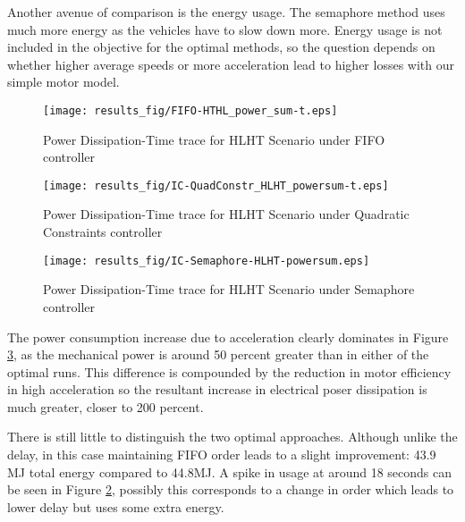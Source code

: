 Another avenue of comparison is the energy usage. The semaphore method uses much more energy as the vehicles have to slow down more. Energy usage is not included in the objective for the optimal methods, so the question depends on whether higher average speeds or more acceleration lead to higher losses with our simple motor model.
\begin{figure}
	\texttt{[image: results\_fig/FIFO-HTHL\_power\_sum-t.eps]}
	\label{fig:fifo_hlht_pow}
	\caption{Power Dissipation-Time trace for HLHT Scenario under FIFO controller}
\end{figure}
\begin{figure}
	\texttt{[image: results\_fig/IC-QuadConstr\_HLHT\_powersum-t.eps]}
	\label{fig:quad_hlht_pow}
	\caption{Power Dissipation-Time trace for HLHT Scenario under Quadratic Constraints controller}
\end{figure}
\begin{figure}
	\texttt{[image: results\_fig/IC-Semaphore-HLHT-powersum.eps]}
	\label{fig:sema_hlht_pow}
	\caption{Power Dissipation-Time trace for HLHT Scenario under Semaphore controller}
\end{figure}

The power consumption increase due to acceleration clearly dominates in Figure \ref{fig:sema_hlht_pow}, as the mechanical power is around 50 percent greater than in either of the optimal runs. This difference is compounded by the reduction in motor efficiency in high acceleration so the resultant increase in electrical poser dissipation is much greater, closer to 200 percent. 

There is still little to distinguish the two optimal approaches. Although unlike the delay, in this case maintaining FIFO order leads to a slight improvement: 43.9 MJ total energy compared to 44.8MJ. A spike in usage at around 18 seconds can be seen in Figure \ref{fig:quad_hlht_pow}, possibly this corresponds to a change in order which leads to lower delay but uses some extra energy. 


